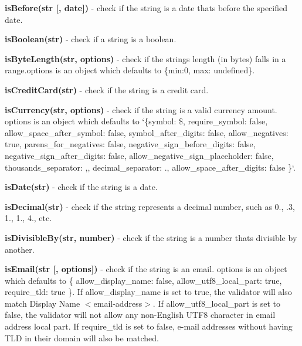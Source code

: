 \begin{DoxyItemize}
\item {\bfseries is\+Before(str \mbox{[}, date\mbox{]})} -\/ check if the string is a date that\textquotesingle{}s before the specified date.
\item {\bfseries is\+Boolean(str)} -\/ check if a string is a boolean.
\item {\bfseries is\+Byte\+Length(str, options)} -\/ check if the string\textquotesingle{}s length (in bytes) falls in a range.{\ttfamily options} is an object which defaults to {\ttfamily \{min\+:0, max\+: undefined\}}.
\item {\bfseries is\+Credit\+Card(str)} -\/ check if the string is a credit card.
\item {\bfseries is\+Currency(str, options)} -\/ check if the string is a valid currency amount. {\ttfamily options} is an object which defaults to `\{symbol\+: \textquotesingle{}\$\textquotesingle{}, require\+\_\+symbol\+: false, allow\+\_\+space\+\_\+after\+\_\+symbol\+: false, symbol\+\_\+after\+\_\+digits\+: false, allow\+\_\+negatives\+: true, parens\+\_\+for\+\_\+negatives\+: false, negative\+\_\+sign\+\_\+before\+\_\+digits\+: false, negative\+\_\+sign\+\_\+after\+\_\+digits\+: false, allow\+\_\+negative\+\_\+sign\+\_\+placeholder\+: false, thousands\+\_\+separator\+: \textquotesingle{},\textquotesingle{}, decimal\+\_\+separator\+: \textquotesingle{}.\textquotesingle{}, allow\+\_\+space\+\_\+after\+\_\+digits\+: false \}`.
\item {\bfseries is\+Date(str)} -\/ check if the string is a date.
\item {\bfseries is\+Decimal(str)} -\/ check if the string represents a decimal number, such as 0., .3, 1., 1., 4., etc.
\item {\bfseries is\+Divisible\+By(str, number)} -\/ check if the string is a number that\textquotesingle{}s divisible by another.
\item {\bfseries is\+Email(str \mbox{[}, options\mbox{]})} -\/ check if the string is an email. {\ttfamily options} is an object which defaults to {\ttfamily \{ allow\+\_\+display\+\_\+name\+: false, allow\+\_\+utf8\+\_\+local\+\_\+part\+: true, require\+\_\+tld\+: true \}}. If {\ttfamily allow\+\_\+display\+\_\+name} is set to true, the validator will also match {\ttfamily Display Name $<$email-\/address$>$}. If {\ttfamily allow\+\_\+utf8\+\_\+local\+\_\+part} is set to false, the validator will not allow any non-\/\+English U\+T\+F8 character in email address\textquotesingle{} local part. If {\ttfamily require\+\_\+tld} is set to false, e-\/mail addresses without having T\+LD in their domain will also be matched.

\end{DoxyItemize}
